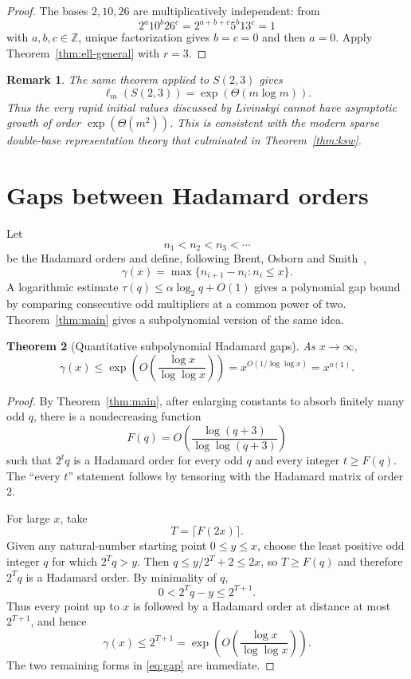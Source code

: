 \documentclass[11pt]{article}
\newtheorem{theorem}{Theorem}[section]
\newtheorem{remark}[theorem]{Remark}
\begin{document}
\begin{proof}
The bases $2,10,26$ are multiplicatively independent: from
\[
2^a10^b26^c=2^{a+b+c}5^b13^c=1
\]
with $a,b,c\in\mathbb Z$, unique factorization gives $b=c=0$ and then $a=0$.  Apply Theorem~\ref{thm:ell-general} with $r=3$.
\end{proof}

\begin{remark}
The same theorem applied to $S(2,3)$ gives
\[
\ell_m(S(2,3))=\exp(\Theta(m\log m)).
\]
Thus the very rapid initial values discussed by Livinskyi cannot have asymptotic growth of order $\exp(\Theta(m^2))$.  This is consistent with the modern sparse double-base representation theory that culminated in Theorem~\ref{thm:ksw}.
\end{remark}

\section{Gaps between Hadamard orders}\label{sec:gaps}
Let
\[
n_1<n_2<n_3<\cdots
\]
be the Hadamard orders and define, following Brent, Osborn and Smith~\cite{Brent2013},
\[
\gamma(x)=\max\{n_{i+1}-n_i:n_i\le x\}.
\]
A logarithmic estimate $\tau(q)\le\alpha\log_2q+O(1)$ gives a polynomial gap bound by comparing consecutive odd multipliers at a common power of two.  Theorem~\ref{thm:main} gives a subpolynomial version of the same idea.

\begin{theorem}[Quantitative subpolynomial Hadamard gaps]\label{thm:gaps}
As $x\to\infty$,
\begin{equation}\label{eq:gap}
\gamma(x)
\le
\exp\!\left(O\!\left(\frac{\log x}{\log\log x}\right)\right)
=x^{O(1/\log\log x)}
=x^{o(1)}.
\end{equation}
\end{theorem}

\begin{proof}
By Theorem~\ref{thm:main}, after enlarging constants to absorb finitely many odd $q$, there is a nondecreasing function
\[
F(q)=O\!\left(\frac{\log(q+3)}{\log\log(q+3)}\right)
\]
such that $2^tq$ is a Hadamard order for every odd $q$ and every integer $t\ge F(q)$.  The ``every $t$'' statement follows by tensoring with the Hadamard matrix of order $2$.

For large $x$, take
\[
T=\lceil F(2x)\rceil.
\]
Given any natural-number starting point $0\le y\le x$, choose the least positive odd integer $q$ for which
$2^Tq>y$.  Then $q\le y/2^T+2\le 2x$, so $T\ge F(q)$ and therefore $2^Tq$ is a Hadamard order.  By minimality of $q$,
\[
0<2^Tq-y\le2^{T+1}.
\]
Thus every point up to $x$ is followed by a Hadamard order at distance at most $2^{T+1}$, and hence
\[
\gamma(x)\le2^{T+1}
=\exp\!\left(O\!\left(\frac{\log x}{\log\log x}\right)\right).
\]
The two remaining forms in \eqref{eq:gap} are immediate.
\end{proof}
\end{document}
